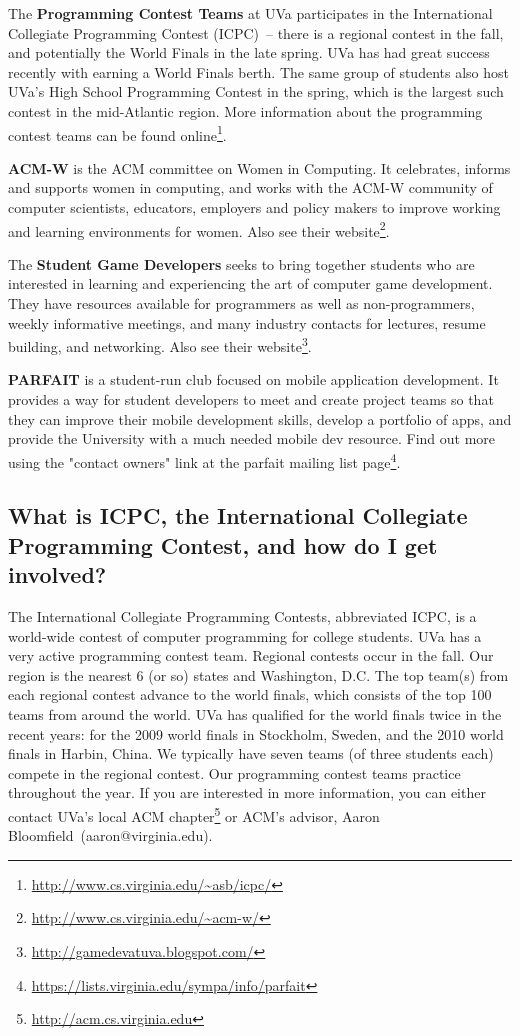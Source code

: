 \documentclass[10pt,letter]{book}
\makeatletter
\newcommand{\acmadvisor}{Aaron Bloomfield}
\newcommand{\acmadvisoremail}{aaron@virginia.edu}
\newcommand{\myurl}[1]{\footnote{\scriptsize\url{#1}}}
\makeatother
\begin{document}
The {\bf Programming Contest Teams} at UVa participates in the
International Collegiate Programming Contest (ICPC)~-- there is a
regional contest in the fall, and potentially the World Finals in the
late spring.  UVa has had great success recently with earning a World
Finals berth.  The same group of students also host UVa's High School
Programming Contest in the spring, which is the largest such contest
in the mid-Atlantic region.  More information about the programming
contest teams can be found
online\myurl{http://www.cs.virginia.edu/~asb/icpc/}.

{\bf ACM-W} is the ACM committee on Women in Computing. It celebrates,
informs and supports women in computing, and works with the ACM-W
community of computer scientists, educators, employers and policy
makers to improve working and learning environments for women. Also
see their website\myurl{http://www.cs.virginia.edu/~acm-w/}.

The {\bf Student Game Developers} seeks to bring together students who
are interested in learning and experiencing the art of computer game
development. They have resources available for programmers as well as
non-programmers, weekly informative meetings, and many industry
contacts for lectures, resume building, and networking. Also see their
website\myurl{http://gamedevatuva.blogspot.com/}.

{\bf PARFAIT} is a student-run club focused on mobile application
development. It provides a way for student developers to meet and
create project teams so that they can improve their mobile development
skills, develop a portfolio of apps, and provide the University with a
much needed mobile dev resource. Find out more using the "contact
owners" link at the parfait mailing list
page\myurl{https://lists.virginia.edu/sympa/info/parfait}.

\subsection{What is ICPC, the International Collegiate Programming
  Contest, and how do I get involved?}

The International Collegiate Programming Contests, abbreviated ICPC,
is a world-wide contest of computer programming for college
students. UVa has a very active programming contest team. Regional
contests occur in the fall.  Our region is the nearest 6 (or so)
states and Washington, D.C. The top team(s) from each regional contest
advance to the world finals, which consists of the top 100 teams from
around the world. UVa has qualified for the world finals twice in the
recent years: for the 2009 world finals in Stockholm, Sweden, and the
2010 world finals in Harbin, China. We typically have seven teams (of
three students each) compete in the regional contest. Our programming
contest teams practice throughout the year. If you are interested in
more information, you can either contact UVa's local ACM
chapter\myurl{http://acm.cs.virginia.edu} or ACM's advisor,
\acmadvisor\ (\acmadvisoremail).
\end{document}
